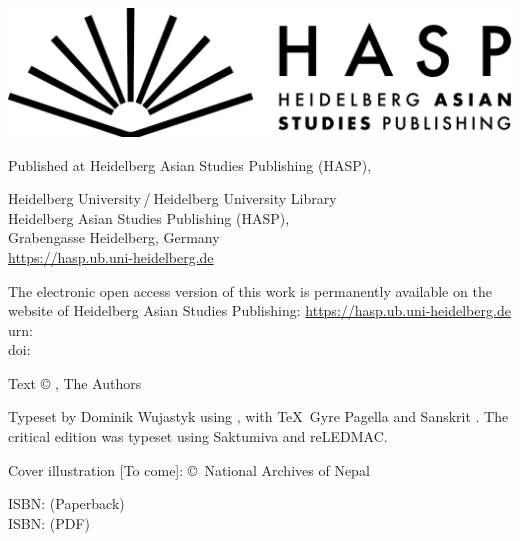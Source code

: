 \documentclass[11pt]{book} %
\begin{document}
\begin{titlepage}
\begin{footnotesize}
\includegraphics[width=.4\linewidth]{media/HASP_horizontal_black}

\medskip
Published at Heidelberg Asian Studies Publishing (HASP), 

\medskip

Heidelberg University / Heidelberg University Library\\
Heidelberg Asian Studies Publishing (HASP),\\
Grabengasse  Heidelberg, Germany\\
\href{https://hasp.ub.uni-heidelberg.de}{https://hasp.ub.uni-heidelberg.de}

\bigskip

The electronic open access version of this work is permanently available on the 
website of 
Heidelberg Asian Studies Publishing: 
\href{https://hasp.ub.uni-heidelberg.de}{https://hasp.ub.uni-heidelberg.de}\\
urn: \\
doi: 
\href{https://doi.org/10.11588/hasp.1203}{}
\medskip


Text © , The Authors
\medskip

Typeset by Dominik Wujastyk using \XeLaTeX, with \TeX\ Gyre
Pagella and Sanskrit . The critical edition was typeset using 
Saktumiva and reLEDMAC.
\medskip

Cover illustration [To come]: \copyright\ National Archives of Nepal

\medskip

ISBN:  (Paperback)\\
ISBN:  (PDF)

\end{footnotesize}


\newpage
\end{titlepage}

    
\thispagestyle{empty}
\setcounter{page}{5}
 
    \tableofcontents
    \pagestyle{fancy}
    
    \newpage

   
    
      \thispagestyle{empty}
  \cleardoublepage

   
     
     
     
    
        \cleardoublepage
    
        \setcounter{page}{46}
     

        \setcounter{page}{57}
     
     

    
\end{document}
